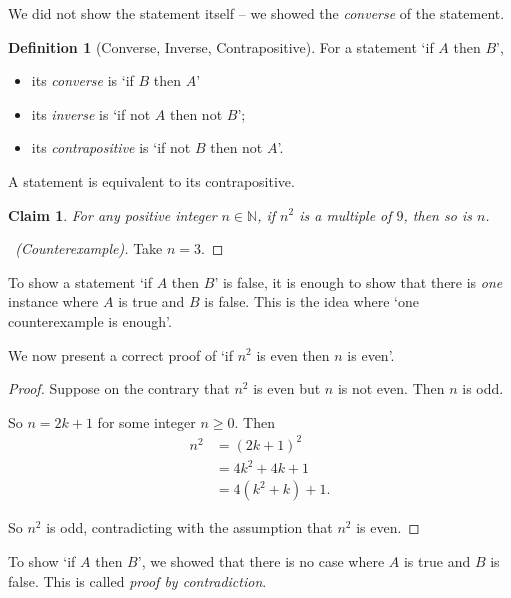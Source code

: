 \documentclass{article}
\newtheorem{claim}[theorem]{Claim}
\theoremstyle{definition}
\newtheorem{definition}[theorem]{Definition}
\theoremstyle{remark}
\newcommand{\pqty}[1]{\left(#1\right)}
\newcommand{\NN}{\mathbb{N}}
\begin{document}
We did not show the statement itself -- we showed the \emph{converse} of the statement.

\begin{definition}[Converse, Inverse, Contrapositive]
    For a statement `if \(A\) then \(B\)',
    \begin{itemize}
        \item its \emph{converse} is `if \(B\) then \(A\)'
        \item its \emph{inverse} is `if not \(A\) then not \(B\)';
        \item its \emph{contrapositive} is `if not \(B\) then not \(A\)'.
    \end{itemize}
\end{definition}

A statement is equivalent to its contrapositive.

\begin{claim}
    For any positive integer \(n \in \NN\), if \(n^2\) is a multiple of \(9\), then so is \(n\).
\end{claim}

\begin{proof}[\proofname\ (Counterexample)]
    Take \(n = 3\).
\end{proof}

To show a statement `if \(A\) then \(B\)' is false, it is enough to show that there is \emph{one} instance where \(A\) is true and \(B\) is false. This is the idea where `one counterexample is enough'.

We now present a correct proof of `if \(n^2\) is even then \(n\) is even'.

\begin{proof}
    Suppose on the contrary that \(n^2\) is even but \(n\) is not even. Then \(n\) is odd.

    So \(n = 2k + 1\) for some integer \(n \geq 0\). Then
    \begin{align*}
        n^2 &= \pqty{2k + 1}^2 \\
        &= 4k^2 + 4k + 1 \\
        &= 4 \pqty{k^2 + k} + 1.
    \end{align*}

    So \(n^2\) is odd, contradicting with the assumption that \(n^2\) is even.
\end{proof}

To show `if \(A\) then \(B\)', we showed that there is no case where \(A\) is true and \(B\) is false. This is called \emph{proof by contradiction}.
\end{document}
